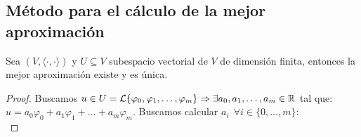 \subsection{Método para el cálculo de la mejor aproximación}
\begin{teo}
    Sea $(V, \langle \cdot, \cdot \rangle)$ y $U \subseteq V$ subespacio vectorial de $V$ de dimensión finita, entonces la mejor
    aproximación existe y es única.
\end{teo}
\begin{proof}
    Buscamos $u \in U = \mathcal{L}\{\varphi_0, \varphi_1, \ldots, \varphi_m\} \Rightarrow \exists a_0, a_1, \ldots, a_m \in \mathbb R$ tal que:
    $u = a_0 \varphi_0 + a_1 \varphi_1 + \ldots + a_m \varphi_m$. Buscamos calcular $a_i~~\forall i \in \{0, \ldots, m\}$:\\


\end{proof}
